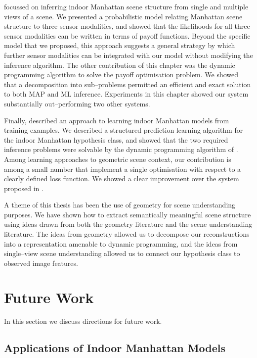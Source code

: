  focussed on inferring indoor Manhattan scene
structure from single and multiple views of a scene. We presented a
probabilistic model relating Manhattan scene structure to three sensor
modalities, and showed that the likelihoods for all three sensor
modalities can be written in terms of payoff functions. Beyond the
specific model that we proposed, this approach suggests a general
strategy by which further sensor modalities can be integrated with our
model without modifying the inference algorithm. The other
contribution of this chapter was the dynamic programming algorithm to
solve the payoff optimisation problem. We showed that a decomposition
into sub--problems permitted an efficient and exact solution to both
MAP and ML inference. Experiments in this chapter showed our system
substantially out--performing two other systems.

Finally,  described an approach to learning indoor
Manhattan models from training examples. We described a structured
prediction learning algorithm for the indoor Manhattan hypothesis
class, and showed that the two required inference problems were
solvable by the dynamic programming algorithm of
. Among learning approaches to geometric scene
context, our contribution is among a small number that
implement a single optimisation with respect to a clearly defined loss
function. We showed a clear improvement over the system proposed in
.

A theme of this thesis has been the use of geometry for scene
understanding purposes. We have shown how to extract semantically
meaningful scene structure using ideas drawn from both the geometry
literature and the scene understanding literature. The ideas from
geometry allowed us to decompose our reconstructions into a
representation amenable to dynamic programming, and the ideas from
single--view scene understanding allowed us to connect our hypothesis
class to observed image features.

\section{Future Work}

In this section we discuss directions for future work.

\subsection{Applications of Indoor Manhattan Models}

